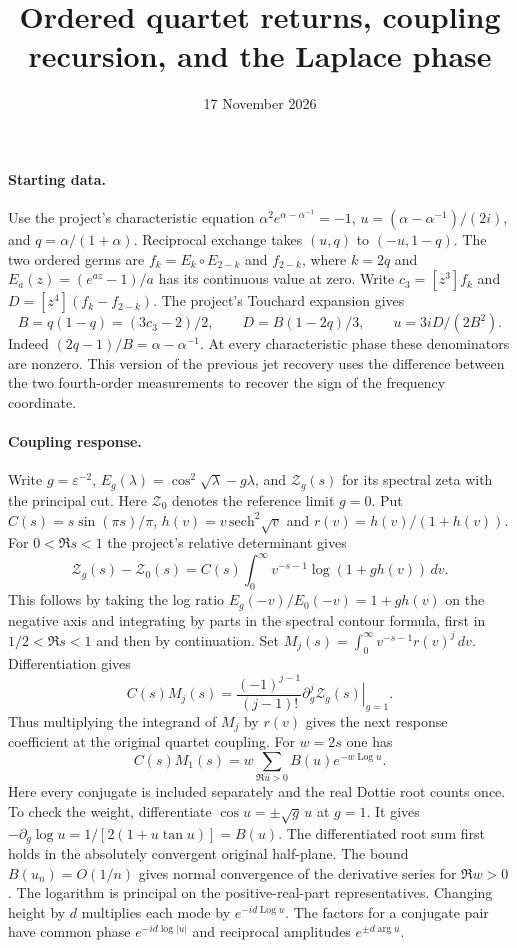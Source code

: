 \documentclass[11pt]{article}
\title{Ordered quartet returns, coupling recursion, and the Laplace phase}
\date{17 November 2026}
\begin{document}
\maketitle

\paragraph{Starting data.}
Use the project's characteristic equation $\alpha^2e^{\alpha-\alpha^{-1}}=-1$,
$u=(\alpha-\alpha^{-1})/(2i)$, and $q=\alpha/(1+\alpha)$.
Reciprocal exchange takes $(u,q)$ to $(-u,1-q)$.
The two ordered germs are $f_k=E_k\circ E_{2-k}$ and $f_{2-k}$,
where $k=2q$ and $E_a(z)=(e^{az}-1)/a$ has its continuous value at zero.
Write $c_3=[z^3]f_k$ and $D=[z^4](f_k-f_{2-k})$.
The project's Touchard expansion gives
\[
 B=q(1-q)=(3c_3-2)/2,\qquad D=B(1-2q)/3,\qquad
 \boxed{u=3iD/(2B^2).}
\]
Indeed $(2q-1)/B=\alpha-\alpha^{-1}$. At every characteristic phase these
denominators are nonzero. This version of the previous jet recovery uses
the difference between the two fourth-order measurements to recover the
sign of the frequency coordinate.

\paragraph{Coupling response.}
Write $g=\varepsilon^{-2}$, $E_g(\lambda)=\cos^2\sqrt{\lambda}-g\lambda$,
and $\mathcal Z_g(s)$ for its spectral zeta with the principal cut. Here
$\mathcal Z_0$ denotes the reference limit $g=0$.
Put $C(s)=s\sin(\pi s)/\pi$, $h(v)=v\,\mathrm{sech}^2\sqrt v$ and
$r(v)=h(v)/(1+h(v))$. For $0<\Re s<1$ the project's relative determinant gives
\[
 \mathcal Z_g(s)-\mathcal Z_0(s)
 =C(s)\int_0^\infty v^{-s-1}\log(1+g h(v))\,dv .
\]
This follows by taking the log ratio $E_g(-v)/E_0(-v)=1+g h(v)$
on the negative axis and integrating by parts in the spectral contour formula,
first in $1/2<\Re s<1$ and then by continuation.
Set $M_j(s)=\int_0^\infty v^{-s-1}r(v)^j\,dv$. Differentiation gives
\[
 C(s)M_j(s)=
 \frac{(-1)^{j-1}}{(j-1)!}\left.\partial_g^j\mathcal Z_g(s)\right|_{g=1}.
\]
Thus multiplying the integrand of $M_j$ by $r(v)$ gives the next response
coefficient at the original quartet coupling.
For $w=2s$ one has
\[
 C(s)M_1(s)=w\sum_{\Re u>0} B(u)e^{-w\operatorname{Log}u}.
\]
Here every conjugate is included separately and the real Dottie root counts once.
To check the weight, differentiate $\cos u=\pm\sqrt g\,u$ at $g=1$.
It gives $-\partial_g\log u=1/[2(1+u\tan u)]=B(u)$.
The differentiated root sum first holds in the absolutely convergent
original half-plane. The bound $B(u_n)=O(1/n)$ gives normal convergence
of the derivative series for $\Re w>0$. The logarithm is principal
on the positive-real-part representatives. Changing height by $d$ multiplies
each mode by $e^{-id\operatorname{Log}u}$. The factors for a conjugate pair
have common phase $e^{-id\log|u|}$ and reciprocal amplitudes
$e^{\pm d\arg u}$.
\end{document}

